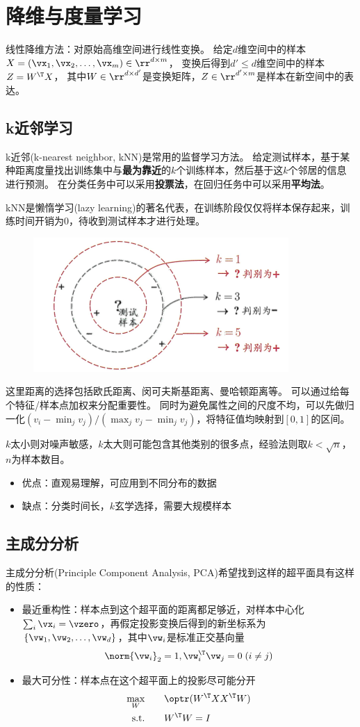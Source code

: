 
\section{降维与度量学习}
线性降维方法：对原始高维空间进行线性变换。
给定$d$维空间中的样本$X=(\vx_1,\vx_2,\ldots,\vx_m)\in\rr^{d\times m}$，
变换后得到$d'\leq d$维空间中的样本$Z=W^\T X$，
其中$W\in\rr^{d\times d'}$是变换矩阵，$Z\in\rr^{d'\times m}$是样本在新空间中的表达。

\subsection{k近邻学习}
k近邻(k-nearest neighbor, kNN)是常用的监督学习方法。
给定测试样本，基于某种距离度量找出训练集中与\textbf{最为靠近}的$k$个训练样本，然后基于这$k$个邻居的信息进行预测。
在分类任务中可以采用\textbf{投票法}，在回归任务中可以采用\textbf{平均法}。

kNN是懒惰学习(lazy learning)的著名代表，在训练阶段仅仅将样本保存起来，训练时间开销为0，待收到测试样本才进行处理。
\begin{figure}[H]
\centering
\includegraphics[width=0.4\linewidth]{fig/kNN.png}
\end{figure}

这里距离的选择包括欧氏距离、闵可夫斯基距离、曼哈顿距离等。
可以通过给每个特征/样本点加权来分配重要性。
同时为避免属性之间的尺度不均，可以先做归一化$(v_i-\min_j v_j)/(\max_j v_j-\min_j v_j)$，将特征值均映射到$[0,1]$的区间。

$k$太小则对噪声敏感，$k$太大则可能包含其他类别的很多点，经验法则取$k<\sqrt{n}$，$n$为样本数目。

\begin{itemize}
	\item 优点：直观易理解，可应用到不同分布的数据
	\item 缺点：分类时间长，$k$玄学选择，需要大规模样本
\end{itemize}

\subsection{主成分分析}
主成分分析(Principle Component Analysis, PCA)希望找到这样的超平面具有这样的性质：
\begin{itemize}
	\item 最近重构性：样本点到这个超平面的距离都足够近，对样本中心化$\sum_i\vx_i=\vzero$，再假定投影变换后得到的新坐标系为$\{\vw_1,\vw_2,\ldots,\vw_d\}$，其中$\vw_i$是标准正交基向量
	\[\norm{\vw_i}_2=1,\vw_i^\T\vw_j=0\;(i\ne j)\]
	\item 最大可分性：样本点在这个超平面上的投影尽可能分开
	\[\begin{aligned}
	\max_{W} &\qquad \optr(W^\T XX^\T W)\\
	\text{s.t.} &\qquad W^\T W=I
	\end{aligned}\]
\end{itemize}

